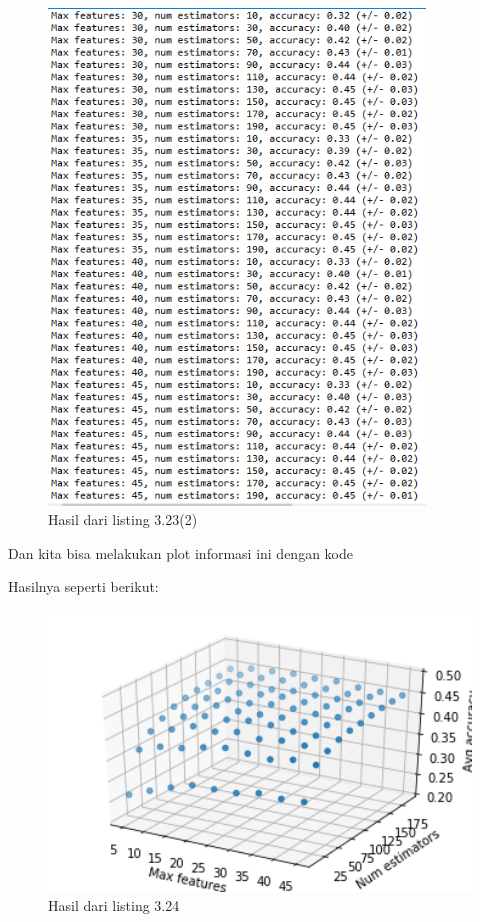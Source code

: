 \begin{figure}[H]
	\centering
	\includegraphics[width=10cm]{figures/1174083/figures3/32a.png}
	\caption{Hasil dari listing 3.23(2)}
\end{figure}


Dan kita bisa melakukan plot informasi ini dengan kode

Hasilnya seperti berikut:
\begin{figure}[H]
	\centering
	\includegraphics[width=12cm]{figures/1174083/figures3/33.png}
	\caption{Hasil dari listing 3.24}
\end{figure}


